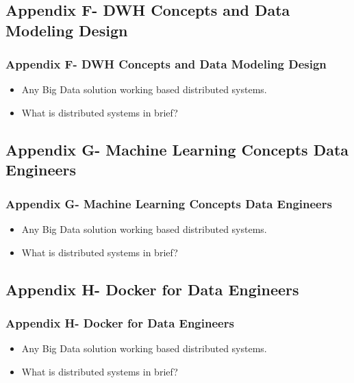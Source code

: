 
\subsection{Appendix F- DWH Concepts and Data Modeling Design}
\begin{frame}
\frametitle{Appendix F- DWH Concepts and Data Modeling Design}
\begin{itemize}[<+->]
	\item Any Big Data solution working based distributed systems.
	\item What is distributed systems in brief?
\end{itemize}
\end{frame}


\subsection{Appendix G- Machine Learning Concepts Data Engineers}
\begin{frame}
\frametitle{Appendix G- Machine Learning Concepts Data Engineers}
\begin{itemize}[<+->]
	\item Any Big Data solution working based distributed systems.
	\item What is distributed systems in brief?
\end{itemize}
\end{frame}


\subsection{Appendix H- Docker for Data Engineers}
\begin{frame}
\frametitle{Appendix H- Docker for Data Engineers}
\begin{itemize}[<+->]
	\item Any Big Data solution working based distributed systems.
	\item What is distributed systems in brief?
\end{itemize}
\end{frame}




